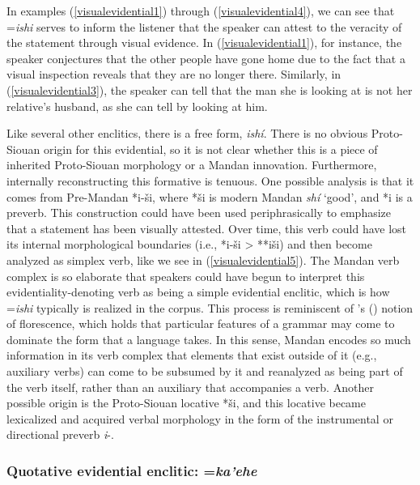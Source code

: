 In examples (\ref{visualevidential1}) through (\ref{visualevidential4}), we can see that =\textit{ishi} serves to inform the listener that the speaker can attest to the veracity of the statement through visual evidence. In (\ref{visualevidential1}), for instance, the speaker conjectures that the other people have gone home due to the fact that a visual inspection reveals that they are no longer there. Similarly, in (\ref{visualevidential3}), the speaker can tell that the man she is looking at is not her relative's husband, as she can tell by looking at him.

Like several other enclitics, there is a free form, \textit{ishí}. There is no obvious Proto-Siouan origin for this evidential, so it is not clear whether this is a piece of inherited Proto-Siouan morphology or a Mandan innovation. Furthermore, internally reconstructing this formative is tenuous. One possible analysis is that it comes from Pre-Mandan *i-ši, where *ši is modern Mandan \textit{shí} `good', and *i is a preverb. This construction could have been used periphrasically to emphasize that a statement has been visually attested. Over time, this verb could have lost its internal morphological boundaries (i.e., *i-ši > **iši) and then become analyzed as simplex verb, like we see in (\ref{visualevidential5}). The Mandan verb complex is so elaborate that speakers could have begun to interpret this evidentiality-denoting verb as being a simple evidential enclitic, which is how =\textit{ishi} typically is realized in the corpus. This process is reminiscent of \citeauthor{chafe1999}'s (\citeyear[39]{chafe1999}) notion of florescence, which holds that particular features of a grammar may come to dominate the form that a language takes. In this sense, Mandan encodes so much information in its verb complex that elements that exist outside of it (e.g., auxiliary verbs) can come to be subsumed by it and reanalyzed as being part of the verb itself, rather than an auxiliary that accompanies a verb. Another possible origin is the Proto-Siouan locative *\v{s}i, and this locative became lexicalized and acquired verbal morphology in the form of the instrumental or directional preverb \textit{i}-.

\subsubsection{Quotative evidential enclitic: =\textit{ka'ehe}}

